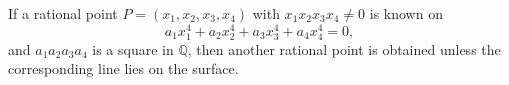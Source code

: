 \begin{proposition}
    If a rational point $P=(x_1,x_2,x_3,x_4)$ with $x_1x_2x_3x_4\ne0$ is known on
\[
    a_1x_1^4+a_2x_2^4+a_3x_3^4+a_4x_4^4=0,
\]
    and $a_1a_2a_3a_4$ is a square in $\mathbb{Q}$, then another rational point is obtained unless the corresponding line lies on the surface.
\end{proposition}
